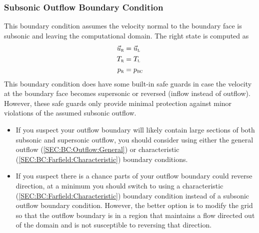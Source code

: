 \subsubsection{Subsonic Outflow Boundary Condition}%
\label{SEC:BC:Outflow:Subsonic}

This boundary condition assumes the velocity normal to the boundary face is
subsonic and leaving the computational domain.
%
The right state is computed as
%
\begin{alignat*}{1}
  \vec{u}_{\textsc{r}} & = \vec{u}_{\textsc{l}} \\
  T_{\textsc{r}} & = T_{\textsc{l}} \\
  p_{\textsc{r}} & = p_{\textsc{bc}}
\end{alignat*}
%
This boundary condition does have some built-in safe guards in case the
velocity at the boundary face becomes supersonic or reversed (\thatis inflow
instead of outflow).
%
However, these safe guards only provide minimal protection against
minor violations of the assumed subsonic outflow.
%
\begin{itemize}[itemsep=5pt,topsep=5pt,parsep=0pt]
  \item If you suspect your outflow boundary will likely contain large sections
    of both subsonic and supersonic outflow, you should consider using either
    the general outflow (\ref{SEC:BC:Outflow:General}) or characteristic
    (\ref{SEC:BC:Farfield:Characteristic}) boundary conditions.
  \item If you suspect there is a chance parts of your outflow boundary could
    reverse direction, at a minimum you should switch to using a characteristic
    (\ref{SEC:BC:Farfield:Characteristic}) boundary condition instead of a
    subsonic outflow boundary condition. However, the better option is to modify
    the grid so that the outflow boundary is in a region that maintains a flow
    directed out of the domain and is not susceptible to reversing that
    direction.
\end{itemize}



